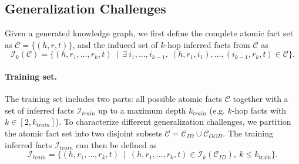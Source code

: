 \documentclass{article} %
\newcommand{\yy}[1]{\textcolor{blue}{[Yuekun: #1]}}
\begin{document}
\subsection{Generalization Challenges}

Given a generated knowledge graph, we first define the complete atomic fact set as $\mathcal{C} = \{(h, r, t)\}$, and the induced set of $k$-hop inferred facts from $\mathcal{C}$ as
\[
\mathcal{I}_k(\mathcal{C}) = \{(h, r_1, \dots, r_k, t)\ \mid\ \exists\ i_1, \dots, i_{k-1},\ (h, r_1, i_1), \dots, (i_{k-1}, r_k, t) \in \mathcal{C} \}.
\]
\paragraph{Training set.} The training set includes two parts: all possible atomic facts $\mathcal{C}$ together with a set of inferred facts $\mathcal{I}_{train}$ up to a maximum depth $k_{train}$ (e.g. $k$-hop facts with $k \in [2, k_{train}]$).
To characterize different generalization challenges, we partition the atomic fact set into two disjoint subsets
$\mathcal{C} = \mathcal{C}_{ID} \cup \mathcal{C}_{OOD}$.
The training inferred facts $\mathcal{I}_{train}$ can then be defined as
\[
\mathcal{I}_{train} = \{(h, r_1, \dots, r_k, t)\ \mid\ (h, r_1, \dots, r_k, t) \in \mathcal{I}_k(\mathcal{C}_{ID}),\ k \le k_{\text{train}} \}.
\]
\end{document}
